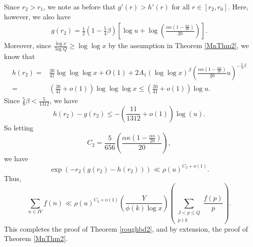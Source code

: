\documentclass{amsart}
\begin{document}
Since $r_2>r_1$, we note as before that $g'(r)>h'(r)$ for all $r\in [r_2,r_0]$.  Here, however, we also have
\begin{gather*}g(r_2)=\frac 12\left(1-\frac 54\beta \right)\left[\log u+\log\left(\frac{\alpha\kappa \left(1-\frac{\alpha \kappa}{20}\right)}{20}\right)\right].
\end{gather*}
Moreover, since $\frac{\log x}{\log Q}\geq \log \log x$ by the assumption in Theorem \ref{MnThm2}, we know that
\begin{align*}
h(r_2)=&\frac{20}{41}\log\log\log x+O(1)+2A_1 (\log\log x)^{\beta}\left(\frac{\alpha\kappa \left(1-\frac{\alpha \kappa}{20}\right)}{20}u\right)^{-\frac 54\beta }\\
=&\left(\frac{20}{41}+o(1)\right)\log\log\log x\leq \left(\frac{20}{41}+o(1)\right)\log u.\end{align*}
Since $\frac{5}{8}\beta<\frac{5}{1312}$, we have
$$h(r_2)-g(r_2)\leq -\left(\frac{11}{1312}+o(1)\right)\log \left(u\right).$$
So letting 
$$C_2=\frac{5}{656}\left(\frac{\alpha\kappa \left(1-\frac{\alpha \kappa}{20}\right)}{20}\right),$$
we have
$$\exp\left(-r_2(g(r_2)-h(r_2))\right)\ll \rho(u)^{C_2+o(1)}.$$
Thus,
$$\sum_{n\in IV}f(n)\ll \rho(u)^{C_2+o(1)}\left(\frac{Y}{\phi(k)\log x}\right)\left(\sum_{\substack{J<p\leq Q \\ p\nmid k}}\frac{f(p)}{p}\right).$$
This completes the proof of Theorem \ref{roughbd2}, and by extension, the proof of Theorem \ref{MnThm2}.
\end{document}
